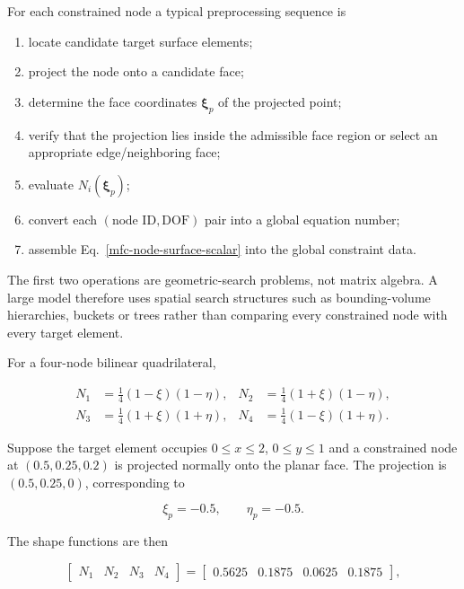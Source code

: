For each constrained node a typical preprocessing sequence is

\begin{enumerate}
    \item locate candidate target surface elements;
    \item project the node onto a candidate face;
    \item determine the face coordinates $\boldsymbol\xi_p$ of the projected
    point;
    \item verify that the projection lies inside the admissible face region or
    select an appropriate edge/neighboring face;
    \item evaluate $N_i(\boldsymbol\xi_p)$;
    \item convert each $(\text{node ID},\text{DOF})$ pair into a global equation
    number;
    \item assemble Eq.~\eqref{mfc-node-surface-scalar} into the global
    constraint data.
\end{enumerate}

The first two operations are geometric-search problems, not matrix algebra. A
large model therefore uses spatial search structures such as bounding-volume
hierarchies, buckets or trees rather than comparing every constrained node with
every target element.

For a four-node bilinear quadrilateral,

\begin{equation}
\begin{aligned}
N_1&=\tfrac14(1-\xi)(1-\eta), &
N_2&=\tfrac14(1+\xi)(1-\eta),\\
N_3&=\tfrac14(1+\xi)(1+\eta), &
N_4&=\tfrac14(1-\xi)(1+\eta).
\end{aligned}
\end{equation}

Suppose the target element occupies $0\le x\le2$, $0\le y\le1$ and a constrained
node at $(0.5,0.25,0.2)$ is projected normally onto the planar face. The
projection is $(0.5,0.25,0)$, corresponding to

\begin{equation}
    \xi_p=-0.5,
    \qquad
    \eta_p=-0.5.
\end{equation}

The shape functions are then

\begin{equation}
    \begin{bmatrix}N_1&N_2&N_3&N_4\end{bmatrix}
    =
    \begin{bmatrix}
        0.5625&0.1875&0.0625&0.1875
    \end{bmatrix},
\end{equation}

